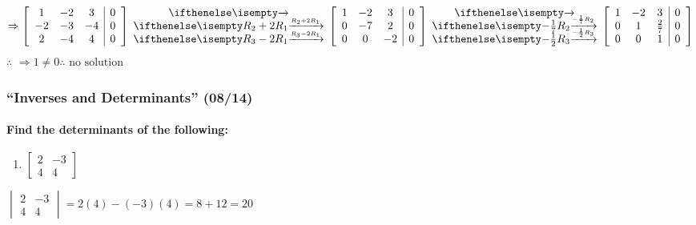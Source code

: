 \documentclass[
  letterpaper,
  DIV=11,
  numbers=noendperiod]{scrartcl}
\let\oldparagraph\paragraph
\renewcommand{\paragraph}[1]{\oldparagraph{#1}\mbox{}}
\providecommand{\tightlist}{%
  \setlength{\itemsep}{0pt}\setlength{\parskip}{0pt}}\usepackage{longtable,booktabs,array}
\begin{document}
\begin{equation*}
\begin{aligned}
\Rightarrow \left[\begin{array}{ccc|c}1 & -2 & 3 & 0 \\ -2 & -3 & -4 & 0 \\ 2 & -4 & 4 & 0\end{array}\right] \rowops{,R_2+2R_1,R_3-2R_1}\left[\begin{array}{ccc|c}1 & -2 & 3 & 0 \\ 0 & -7 & 2 & 0 \\ 0 & 0 & -2 & 0\end{array}\right] \rowops{,-\frac{1}{7}R_2,-\frac{1}{2}R_3}\left[\begin{array}{ccc|c}1 & -2 & 3 & 0 \\ 0 & 1 & \frac{2}{7} & 0 \\ 0 & 0 & 1 & 0\end{array}\right]
\end{aligned}
\end{equation*} \(\therefore\)
\(\Rightarrow 1 \ne 0 \therefore \text{ no solution}\)

\newpage{}

\hypertarget{inverses-and-determinants-0814}{%
\subsubsection{``Inverses and Determinants''
(08/14)}\label{inverses-and-determinants-0814}}

\hypertarget{find-the-determinants-of-the-following}{%
\paragraph{Find the determinants of the
following:}\label{find-the-determinants-of-the-following}}

\begin{enumerate}
\def\labelenumi{\arabic{enumi})}
\tightlist
\item
  \(\begin{bmatrix}2 & -3 \\ 4 & 4 \end{bmatrix}\)
\end{enumerate}

\(\begin{vmatrix}2 & -3 \\ 4 & 4 \end{vmatrix} = 2(4)-(-3)(4) = 8+12 = 20\)
\end{document}
